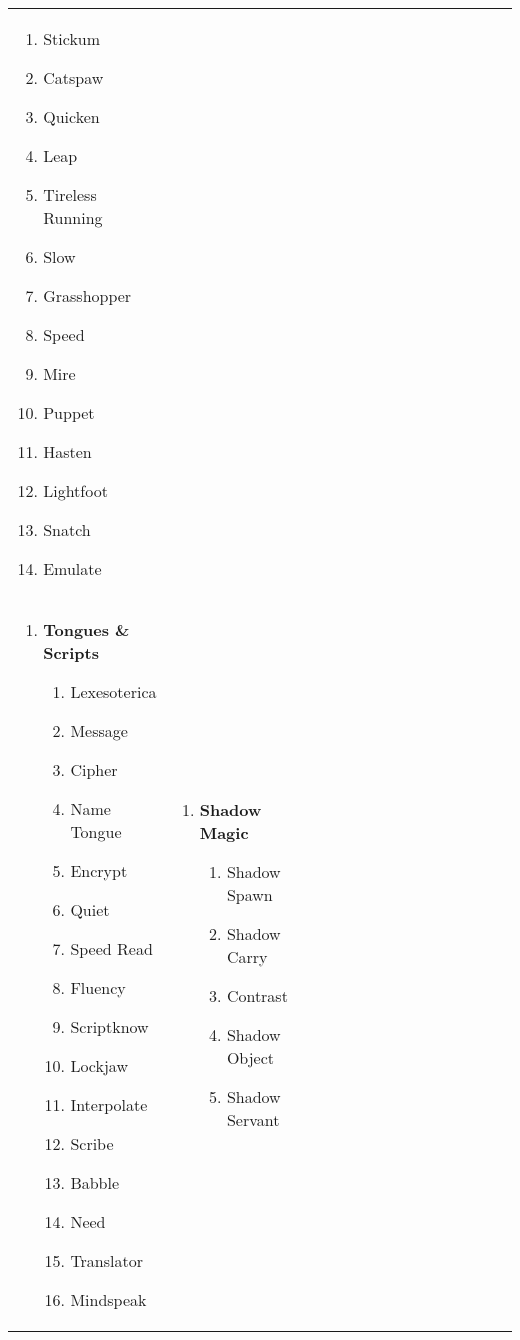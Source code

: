 \begin{tabular}{@{} p{0.25\linewidth} p{0.25\linewidth} p{0.25\linewidth} p{0.25\linewidth}}
\begin{enumerate}
\begin{enumerate}
		\item Stickum
		\item Catspaw
		\item Quicken
		\item Leap
		\item Tireless Running
		\item Slow
		\item Grasshopper
		\item Speed
		\item Mire
		\item Puppet
		\item Hasten
		\item Lightfoot
		\item Snatch
		\item Emulate
	\end{enumerate}
\end{enumerate} \\
\begin{enumerate}
	\item \textbf{Tongues \& Scripts}
	\begin{enumerate}
		\item Lexesoterica
		\item Message
		\item Cipher
		\item Name Tongue
		\item Encrypt
		\item Quiet
		\item Speed Read
		\item Fluency
		\item Scriptknow
		\item Lockjaw
		\item Interpolate
		\item Scribe
		\item Babble
		\item Need
		\item Translator
		\item Mindspeak
	\end{enumerate}
\end{enumerate} &
\begin{enumerate}
	\item \textbf{Shadow Magic}
	\begin{enumerate}
		\item Shadow Spawn
		\item Shadow Carry
		\item Contrast
		\item Shadow Object
		\item Shadow Servant

\end{enumerate}
\end{enumerate}
\end{tabular}
